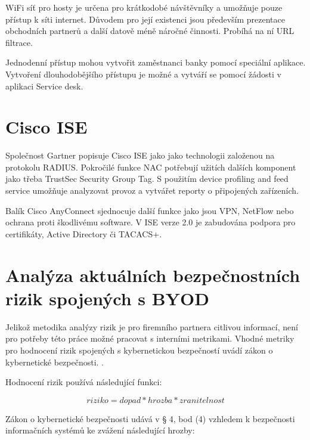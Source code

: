 WiFi síť pro hosty je určena pro krátkodobé návštěvníky a umožňuje pouze přístup k síti internet. Důvodem pro její existenci jsou především prezentace obchodních partnerů a další datově méně náročné činnosti. Probíhá na ní URL filtrace.

Jednodenní přístup mohou vytvořit zaměstnanci banky pomocí speciální aplikace. Vytvoření dlouhodobějšího přístupu je možné a vytváří se pomocí žádosti v aplikaci Service desk. 

\section{Cisco ISE}
Společnost Gartner  popisuje Cisco ISE jako jako technologii založenou na protokolu RADIUS. Pokročilé funkce NAC potřebují užitích dalších komponent jako třeba TrustSec Security Group Tag. S použitím device profiling and feed service umožňuje analyzovat provoz a vytvářet reporty o připojených zařízeních.

Balík Cisco AnyConnect sjednocuje další funkce jako jsou VPN, NetFlow nebo ochrana proti škodlivému software. V ISE verze 2.0 je zabudována podpora pro certifikáty, Active Directory či TACACS+.

\section{Analýza aktuálních bezpečnostních rizik spojených s BYOD}
Jelikož metodika analýzy rizik je pro firemního partnera citlivou informací, není pro potřeby této práce možné pracovat s interními metrikami. Vhodné metriky pro hodnocení rizik spojených s kybernetickou bezpečností uvádí zákon o kybernetické bezpečnosti. .

Hodnocení rizik používá následující funkci:

$$ riziko = dopad * hrozba * zranitelnost $$


Zákon o kybernetické bezpečnosti udává v § 4, bod (4) vzhledem k bezpečnosti informačních systémů ke zvážení následující hrozby:

